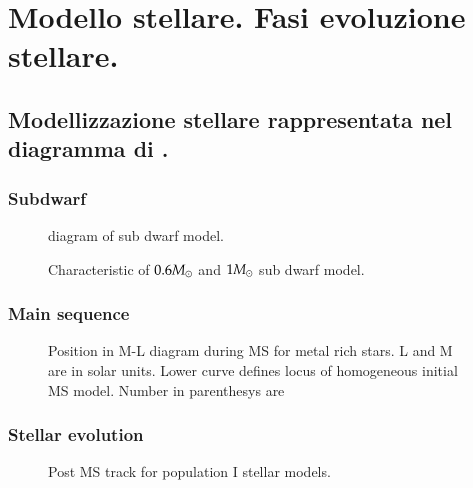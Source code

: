 \chapter{Modello stellare. Fasi evoluzione stellare.}
\PartialToc

\section{Modellizzazione stellare rappresentata nel diagramma di \hr{}.}


\subsection{Subdwarf}

\begin{figure}[!ht]
\centering
\caption{\hr{} diagram of sub dwarf model.}
\end{figure}

\begin{figure}[!ht]
\centering
\caption{Characteristic of $0.6M_{\odot}{}$ and $1M_{\odot}{}$ sub dwarf model.}
\end{figure}

\clearpage

\subsection{Main sequence}

\begin{figure}[!ht]
\centering
\caption{Position in M-L diagram during MS for metal rich stars. L and M are in solar units. Lower curve defines locus of homogeneous initial MS model. Number in parenthesys are }
\end{figure}


\clearpage

\subsection{Stellar evolution}

\begin{figure}[!ht]
\centering
\caption{Post MS track for population I stellar models.}
\end{figure}


